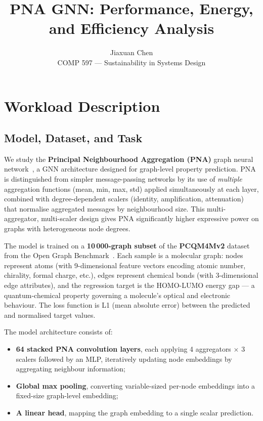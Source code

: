 \documentclass[10pt,twocolumn]{article}
\title{PNA GNN: Performance, Energy, and Efficiency Analysis}
\author{Jiaxuan Chen \\ COMP 597 --- Sustainability in Systems Design}
\date{}
\begin{document}
\maketitle

\section{Workload Description}

\subsection{Model, Dataset, and Task}

We study the \textbf{Principal Neighbourhood Aggregation (PNA)} graph neural network~\cite{corso2020pna}, a GNN architecture designed for graph-level property prediction. PNA is distinguished from simpler message-passing networks by its use of \emph{multiple} aggregation functions (mean, min, max, std) applied simultaneously at each layer, combined with degree-dependent scalers (identity, amplification, attenuation) that normalise aggregated messages by neighbourhood size. This multi-aggregator, multi-scaler design gives PNA significantly higher expressive power on graphs with heterogeneous node degrees.

The model is trained on a \textbf{10\,000-graph subset} of the \textbf{PCQM4Mv2} dataset from the Open Graph Benchmark~\cite{hu2021ogblsc}. Each sample is a molecular graph: nodes represent atoms (with 9-dimensional feature vectors encoding atomic number, chirality, formal charge, etc.), edges represent chemical bonds (with 3-dimensional edge attributes), and the regression target is the HOMO-LUMO energy gap --- a quantum-chemical property governing a molecule's optical and electronic behaviour. The loss function is L1 (mean absolute error) between the predicted and normalised target values.

The model architecture consists of:
\begin{itemize}[nosep]
    \item \textbf{64 stacked PNA convolution layers}, each applying 4 aggregators $\times$ 3 scalers followed by an MLP, iteratively updating node embeddings by aggregating neighbour information;
    \item \textbf{Global max pooling}, converting variable-sized per-node embeddings into a fixed-size graph-level embedding;
    \item \textbf{A linear head}, mapping the graph embedding to a single scalar prediction.
\end{itemize}
\end{document}
